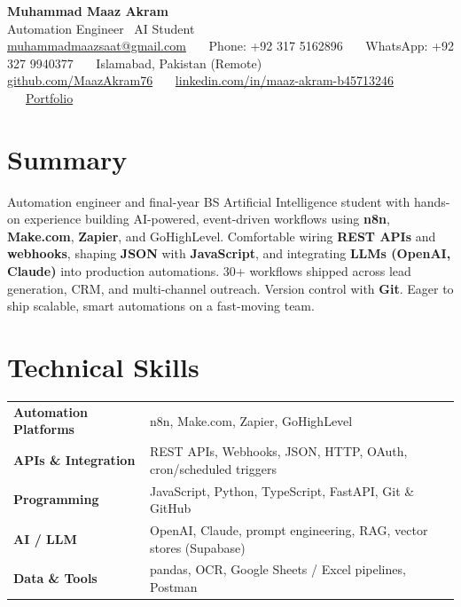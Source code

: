 \documentclass[a4paper,11pt]{article}
\begin{document}
{\Huge\bfseries Muhammad Maaz Akram}\\[2pt]
{\large\color{accent} Automation Engineer \textbullet\ AI Student}\\[6pt]
{\small
\href{mailto:muhammadmaazsaat@gmail.com}{muhammadmaazsaat@gmail.com} \ \textbullet\ \
Phone: +92 317 5162896 \ \textbullet\ \ WhatsApp: +92 327 9940377 \ \textbullet\ \ Islamabad, Pakistan (Remote)\\[3pt]
\href{https://github.com/MaazAkram76}{github.com/MaazAkram76} \ \textbullet\ \
\href{https://www.linkedin.com/in/maaz-akram-b45713246/}{linkedin.com/in/maaz-akram-b45713246} \ \textbullet\ \
\href{https://PORTFOLIO-URL}{Portfolio} %
}

\section{Summary}
Automation engineer and final-year BS Artificial Intelligence student with hands-on experience building
AI-powered, event-driven workflows using \textbf{n8n}, \textbf{Make.com}, \textbf{Zapier}, and GoHighLevel.
Comfortable wiring \textbf{REST APIs} and \textbf{webhooks}, shaping \textbf{JSON} with \textbf{JavaScript}, and
integrating \textbf{LLMs (OpenAI, Claude)} into production automations. 30+ workflows shipped across lead
generation, CRM, and multi-channel outreach. Version control with \textbf{Git}. Eager to ship scalable, smart
automations on a fast-moving team.

\section{Technical Skills}
\begin{tabular}{@{}>{\bfseries}p{4.2cm} p{12.5cm}@{}}
Automation Platforms & n8n, Make.com, Zapier, GoHighLevel \\
APIs \& Integration   & REST APIs, Webhooks, JSON, HTTP, OAuth, cron/scheduled triggers \\
Programming           & JavaScript, Python, TypeScript, FastAPI, Git \& GitHub \\
AI / LLM              & OpenAI, Claude, prompt engineering, RAG, vector stores (Supabase) \\
Data \& Tools         & pandas, OCR, Google Sheets / Excel pipelines, Postman \\
\end{tabular}
\end{document}
